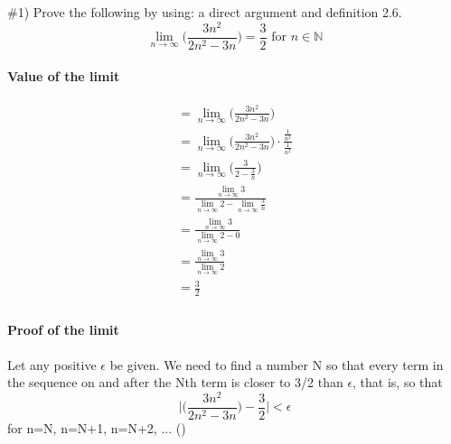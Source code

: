 \documentclass[11pt]{article}
\begin{document}

\section{}

\#1) Prove the following by using: a direct argument and definition 2.6.
\begin{equation}
	\lim_{n \rightarrow \infty} \bigg(\frac{3n^2}{2n^2-3n}\bigg)=\frac{3}{2}\text{ for }n \in \mathbb{N}
\end{equation}

\paragraph{Value of the limit}
\begin{equation}
	\begin{aligned}
		= \lim_{n \rightarrow \infty} \bigg(\frac{3n^2}{2n^2-3n}\bigg) \\
		= \lim_{n \rightarrow \infty} \bigg(\frac{3n^2}{2n^2-3n}\bigg) \cdot \frac{\frac{1}{n^2}}{\frac{1}{n^2}} \\
		= \lim_{n \rightarrow \infty} \bigg(\frac{3}{2-\frac{3}{n}}\bigg) \\
		= \frac{\displaystyle\lim_{n \rightarrow \infty} 3}{\displaystyle\lim_{n \rightarrow \infty} 2 - \displaystyle\lim_{n \rightarrow \infty} \frac{3}{n}} \\
		= \frac{\displaystyle\lim_{n \rightarrow \infty} 3}{\displaystyle\lim_{n \rightarrow \infty} 2 - 0} \\
		= \frac{\displaystyle\lim_{n \rightarrow \infty} 3}{\displaystyle\lim_{n \rightarrow \infty} 2} \\
		= \frac{3}{2} \\
	\end{aligned}
\end{equation}

\paragraph{Proof of the limit}

Let any positive $\epsilon$ be given.  We need to find a number N so that every term in the sequence on and after the Nth term is closer to 3/2 than $\epsilon$, that is, so that
\begin{equation}
	\bigg|\bigg(\frac{3n^2}{2n^2-3n}\bigg) - \frac{3}{2}\bigg| < \epsilon
\end{equation}
for n=N, n=N+1, n=N+2, ... (\cite{tbb})
\end{document}
